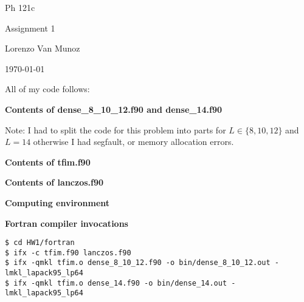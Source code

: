 \documentclass{article}
\begin{document}
{\centering

Ph 121c

Assignment 1

Lorenzo Van Munoz

\today

}

\newpage


All of my code follows:

\newpage

{\bf \noindent
Contents of dense_8_10_12.f90 and dense_14.f90
}

Note: I had to split the code for this problem into parts
for $L \in \{8, 10, 12\}$ and $L=14$ otherwise
I had segfault, or memory allocation errors.





\newpage

{\bf \noindent
Contents of tfim.f90
}



\newpage

{\bf \noindent
Contents of lanczos.f90
}



\newpage

{\bf \noindent
Computing environment
}




{\bf \noindent
Fortran compiler invocations
}

\begin{lstlisting}
$ cd HW1/fortran
$ ifx -c tfim.f90 lanczos.f90
$ ifx -qmkl tfim.o dense_8_10_12.f90 -o bin/dense_8_10_12.out -lmkl_lapack95_lp64
$ ifx -qmkl tfim.o dense_14.f90 -o bin/dense_14.out -lmkl_lapack95_lp64
\end{lstlisting}
\end{document}
